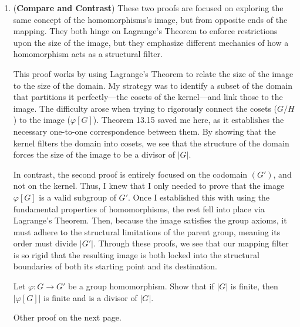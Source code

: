 \begin{enumerate}[label=\textbf{\arabic*.}]
    \item (\textbf{Compare and Contrast}) These two proofs are focused on exploring the same concept of the homomorphisms's image, but from opposite ends of the mapping. They both hinge on Lagrange's Theorem to enforce restrictions upon the size of the image, but they emphasize different mechanics of how a homomorphism acts as a structural filter. 
    
    This proof works by using Lagrange's Theorem to relate the size of the image to the size of the domain. My strategy was to identify a subset of the domain that partitions it perfectly—the cosets of the kernel—and link those to the image. The difficulty arose when trying to rigorously connect the cosets (\(G/H\)) to the image (\(\varphi[G]\)). Theorem 13.15 saved me here, as it establishes the necessary one-to-one correspondence between them. By showing that the kernel filters the domain into cosets, we see that the structure of the domain forces the size of the image to be a divisor of \(|G|\).

    In contrast, the second proof is entirely focused on the codomain \((G')\), and not on the kernel. Thus, I knew that I only needed to prove that the image \(\varphi[G]\) is a valid subgroup of \(G'\). Once I established this with using the fundamental properties of homomorphisms, the rest fell into place via Lagrange's Theorem. Then, because the image satisfies the group axioms, it must adhere to the structural limitations of the parent group, meaning its order must divide \(|G'|\). Through these proofs, we see that our mapping filter is so rigid that the resulting image is both locked into the structural boundaries of both its starting point and its destination. 

    \begin{problem}
        Let \(\varphi : G \to G'\) be a group homomorphism. Show that if \(|G|\) is finite, then \(|\varphi[G]|\) is finite and is a divisor of \(|G|\).
    \end{problem}
    Other proof on the next page.
    \newpage


\end{enumerate}
